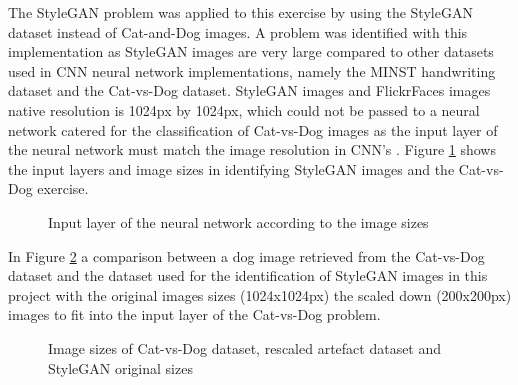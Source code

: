 The StyleGAN problem was applied to this exercise by using the StyleGAN dataset instead of Cat-and-Dog images. A problem was identified with this implementation as StyleGAN images are very large compared to other datasets used in CNN neural network implementations, namely the MINST handwriting dataset and the Cat-vs-Dog dataset. StyleGAN images and FlickrFaces images native resolution is 1024px by 1024px, which could not be passed to a neural network catered for the classification of Cat-vs-Dog images as the input layer of the neural network must match the image resolution in CNN's \citep{cat2014, Wang}. Figure \ref{fig:13} shows the input layers and image sizes in identifying StyleGAN images and the Cat-vs-Dog exercise.

\begin{figure}[H]%
\centering
{}%
\caption{Input layer of the neural network according to the image sizes}%
\label{fig:13}%
\end{figure}

In Figure \ref{fig:12} a comparison between a dog image retrieved from the Cat-vs-Dog dataset and the dataset used for the identification of StyleGAN images in this project with the original images sizes (1024x1024px) the scaled down (200x200px) images to fit into the input layer of the Cat-vs-Dog problem. 

\begin{figure}[H]%
\centering
{}%
\caption{Image sizes of Cat-vs-Dog dataset, rescaled artefact dataset and StyleGAN original sizes}%
\label{fig:12}%
\end{figure}

